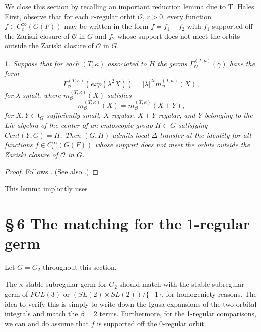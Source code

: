\documentclass[12pt,letterpaper]{amsart}
\newcommand{\proclaimname}{}
\newtheorem*{proclaimx}{\proclaimname}
\newenvironment{proclaim}[1]%
  {\renewcommand{\proclaimname}{#1}\begin{proclaimx}}{\end{proclaimx}}
\begin{document}
We close this section by recalling an important reduction lemma
due to T. Hales. First, observe that for each $r$-regular
orbit ${\mathcal O}$, $r>0$,
every function $f\in C_c^\infty(G(F))$ may be written in the form $f=f_1+f_2$
with $f_1$ supported off the Zariski closure of ${\mathcal O}$ in $G$
and $f_2$ whose support does not meet the orbits outside the
Zariski closure of ${\mathcal O}$ in $G$.

\begin{proclaim}{Reduction Lemma 5.19 (Hales)} Suppose that for each $(T,\kappa)$
associated to $H$
the germs $\Gamma_{{\mathcal O}}^{(T,\kappa)}(\gamma)$ have the form
\[
\Gamma_{{\mathcal O}}^{(T,\kappa)}(exp(\lambda^2 X))=
|\lambda|^{2r}m_{{\mathcal O}}^{(T,\kappa)}(X),
\]
for $\lambda$ small, where $m_{{\mathcal O}}^{(T,\kappa)}(X)$ satisfies
\[
m_{{\mathcal O}}^{(T,\kappa)}(X)=m_{{\mathcal O}}^{(T,\kappa)}(X+Y),
\]
for $X,Y\in {\mathfrak t}_G$ sufficiently small, $X$ regular,
$X+Y$ regular, and $Y$ belonging to the Lie algebra of the center
of an endoscopic group $H\subset G$ satisfying $Cent(Y,G)=H$.
Then $(G,H)$ admits local
$\Delta$-transfer at the identity for all functions $f\in C_c^\infty(G(F))$
whose support does not meet the orbits outside the
Zariski closure of ${\mathcal O}$ in $G$.
\end{proclaim}

\begin{proof} Follows \cite[Lemma 6.1]{Ha92b}. (See also \cite[Proposition
2.11]{Ha89}.)
\end{proof}

This lemma implicitly uses \cite{LS90}.
\section*{\S\,6 The matching for the $1$-regular germ}

Let $G=G_2$ throughout this section.

The $\kappa$-stable subregular germ for $G_2$ should match with the
stable subregular germ of $PGL(3)$ or $(SL(2)\times SL(2))/\{\pm 1\}$,
for homogeniety reasons. The idea to verify this is simply to write down
the Igusa expansions of the two orbital integrals and match the $\beta =2$
terms. Furthermore, for the 1-regular comparisons, we can and do
assume that $f$ is supported off the 0-regular orbit.
\end{document}
